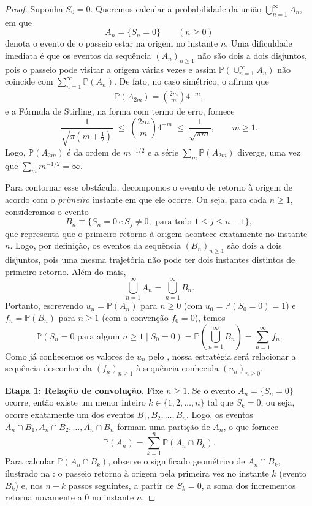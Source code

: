 \documentclass[12pt,portuguese]{article}
\theoremstyle{definition}
\theoremstyle{plainexercise}
\theoremstyle{starredexercise}
\theoremstyle{definition}
\begin{document}
\begin{proof}
Suponha $S_0 = 0$. Queremos calcular a probabilidade da união
$\bigcup_{n=1}^{\infty} A_n$, em que
\[
A_n = \{S_n = 0\}
\qquad (n \geqslant 0)
\]
denota o evento de o passeio estar na origem no instante $n$. Uma dificuldade
imediata é que os eventos da sequência $(A_n)_{n \geqslant 1}$ não são dois a
dois disjuntos, pois o passeio
pode visitar a origem várias vezes e assim $\mathbb{P}(\cup_{n=1}^{\infty} A_n)$
não coincide com $\sum_{n=1}^{\infty} \mathbb{P}(A_n)$. De fato, no caso
simétrico, o  afirma que 
\begin{align*}
\mathbb{P}(A_{2m}) = \binom{2m}{m}4^{-m},
\end{align*} 
e a Fórmula de Stirling, na forma com termo de erro, fornece
\[
  \frac{1}{\sqrt{\pi\left(m+\tfrac{1}{2}\right)}}
  \;\leqslant\; \binom{2m}{m}4^{-m}
  \;\leqslant\; \frac{1}{\sqrt{\pi m}},
  \qquad m \geqslant 1.
\]
Logo, $\mathbb{P}(A_{2m})$ é da ordem de $m^{-1/2}$ e a série
$\sum_{m} \mathbb{P}(A_{2m})$ diverge, uma vez que $\sum_m m^{-1/2} = \infty$.

Para contornar esse obstáculo, decompomos o evento de retorno à origem de acordo com o
\emph{primeiro} instante em que ele ocorre. Ou seja, para cada $n \geqslant 1$, consideramos o evento
\[
B_n \equiv  \{S_n = 0 \ \text{e}\  S_j \neq 0, \text{ para todo } 1 \leqslant j \leqslant n - 1\},
\]
que representa que o primeiro retorno à origem acontece exatamente no instante
$n$. Logo, por definição, os eventos da sequência $(B_n)_{n \geqslant 1}$ são
dois a dois disjuntos, pois uma mesma
trajetória não pode ter dois instantes distintos de primeiro retorno. Além do mais, 
\[
\bigcup_{n=1}^{\infty} A_n = \bigcup_{n=1}^{\infty} B_n.
\]
Portanto, escrevendo $u_n = \mathbb{P}(A_n)$ para $n \geqslant 0$ (com
$u_0 = \mathbb{P}(S_0 = 0) = 1$) e $f_n = \mathbb{P}(B_n)$ para $n \geqslant 1$
(com a convenção $f_0 = 0$), temos
\[
\mathbb{P}(S_n = 0 \text{ para algum } n \geqslant 1 \mid S_0 = 0)
= \mathbb{P}\!\left(\bigcup_{n=1}^{\infty} B_n\right)
= \sum_{n=1}^{\infty} f_n.
\]
Como já conhecemos os valores de $u_n$ pelo , nossa
estratégia será relacionar a sequência desconhecida $(f_n)_{n \geqslant 1}$ à
sequência conhecida $(u_n)_{n \geqslant 0}$.

\smallskip
\noindent\textbf{Etapa 1: Relação de convolução.}
Fixe $n \geqslant 1$. Se o evento $A_n = \{S_n = 0\}$ ocorre, então existe um
menor inteiro $k \in \{1, 2, \ldots, n\}$ tal que $S_k = 0$, ou seja, ocorre
exatamente um dos eventos $B_1, B_2, \ldots, B_n$. Logo, os eventos
$A_n \cap B_1, A_n \cap B_2, \ldots, A_n \cap B_n$ formam uma partição de $A_n$,
o que fornece
\begin{equation*}
\mathbb{P}(A_n) = \sum_{k=1}^{n} \mathbb{P}(A_n \cap B_k).
\end{equation*}
Para calcular $\mathbb{P}(A_n \cap B_k)$, observe o significado geométrico de
$A_n \cap B_k$, ilustrado na : o
passeio retorna à origem pela primeira vez no instante $k$ (evento $B_k$) e, nos
$n - k$ passos seguintes, a partir de $S_k = 0$, a soma dos incrementos retorna
novamente a $0$ no instante $n$.


\end{proof}
\end{document}
